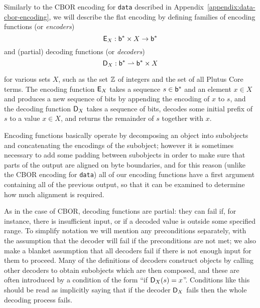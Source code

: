 \medskip
\noindent Similarly to the CBOR encoding for \texttt{data} described in
Appendix~\ref{appendix:data-cbor-encoding}, we will describe the flat encoding
by defining families of encoding functions (or \textit{encoders})
$$
\mathsf{E}_X : \mathsf{b}^* \times X \rightarrow \mathsf{b}^*
$$%
and (partial) decoding functions (or \textit{decoders})
$$
\mathsf{D}_X : \mathsf{b}^* \rightharpoonup \mathsf{b}^* \times X
$$%

\noindent for various sets $X$, such as the set $\mathbb{Z}$ of integers and the set of
all Plutus Core terms.  The encoding function $\mathsf{E}_X$ takes a sequence $s \in
\mathsf{b}^*$ and an element $x \in X$ and produces a new sequence of bits by appending
the encoding of $x$ to $s$, and the decoding function $\mathsf{D}_X$ takes a sequence of
bits, decodes some initial prefix of $s$ to a value $x \in X$, and returns the
remainder of $s$ together with $x$.


Encoding functions basically operate by decomposing an object into subobjects
and concatenating the encodings of the subobject; however it is sometimes
necessary to add some padding between subobjects in order to make sure that
parts of the output are aligned on byte boundaries, and for this reason (unlike
the CBOR encoding for \texttt{data}) all of our encoding functions have a first
argument containing all of the previous output, so that it can be examined to
determine how much alignment is required.

As in the case of CBOR, decoding functions are partial: they can fail if, for
instance, there is insufficient input, or if a decoded value is outside some
specified range.  To simplify notation we will mention any preconditions
separately, with the assumption that the decoder will fail if the preconditions
are not met; we also make a blanket assumption that all decoders fail if there
is not enough input for them to proceed.  Many of the definitions of decoders
construct objects by calling other decoders to obtain subobjects which are then
composed, and these are often introduced by a condition of the form ``if
$\mathsf{D}_X(s) = x$''.  Conditions like this should be read as implicitly saying that
if the decoder $\mathsf{D}_X$ fails then the whole decoding process fails.

